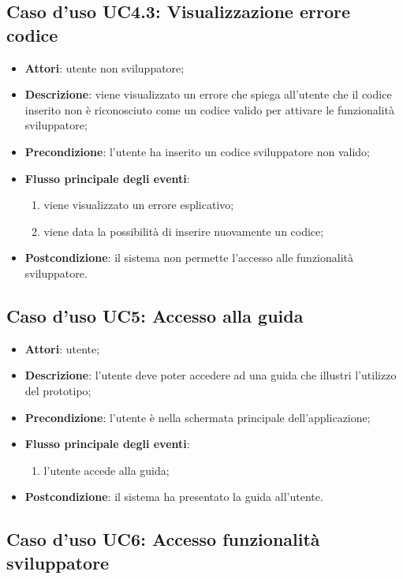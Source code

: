 \documentclass[../AnalisiDeiRequisiti.tex]{subfiles}
\begin{document}
\subsection{Caso d'uso UC4.3: Visualizzazione errore codice}
\begin{itemize}
	\item \textbf{Attori}: utente non sviluppatore;
	\item \textbf{Descrizione}: viene visualizzato un errore che spiega all'utente che il codice inserito non è riconosciuto come un codice valido per attivare le funzionalità sviluppatore; 
	\item \textbf{Precondizione}: l'utente ha inserito un codice sviluppatore non valido;
	
	\item \textbf{Flusso principale degli eventi}:
	\begin{enumerate}
		\item viene visualizzato un errore esplicativo;
		\item viene data la possibilità di inserire nuovamente un codice;
		
	\end{enumerate}
	\item \textbf{Postcondizione}: il sistema non permette l'accesso alle funzionalità sviluppatore.
\end{itemize}
\hypertarget{UC5}{}
\subsection{Caso d'uso UC5: Accesso alla guida}
\begin{itemize}
	\item \textbf{Attori}: utente;
	\item \textbf{Descrizione}: l'utente deve poter accedere ad una guida che illustri l'utilizzo del prototipo; 
	\item \textbf{Precondizione}: l'utente è nella schermata principale dell'applicazione;
	
	\item \textbf{Flusso principale degli eventi}:
	\begin{enumerate}
		\item l'utente accede alla guida;
		
	\end{enumerate}
	\item \textbf{Postcondizione}: il sistema ha presentato la guida all'utente.
\end{itemize}
\hypertarget{UC6}{}
\subsection{Caso d'uso UC6: Accesso funzionalità sviluppatore}
\end{document}
